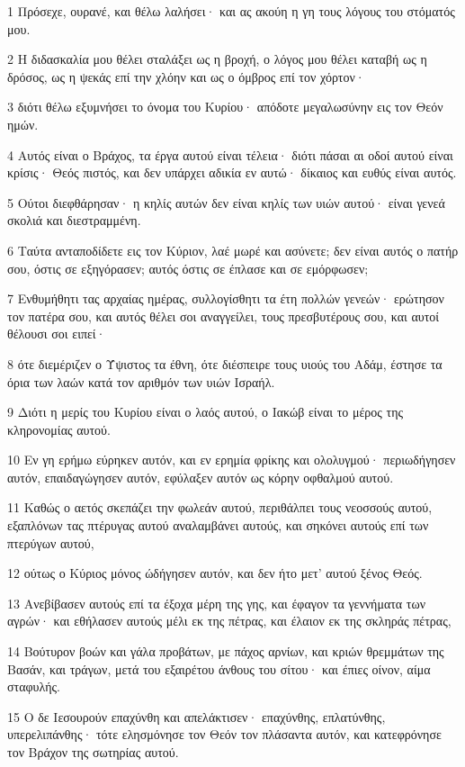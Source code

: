 \par 1 Πρόσεχε, ουρανέ, και θέλω λαλήσει· και ας ακούη η γη τους λόγους του στόματός μου.
\par 2 Η διδασκαλία μου θέλει σταλάξει ως η βροχή, ο λόγος μου θέλει καταβή ως η δρόσος, ως η ψεκάς επί την χλόην και ως ο όμβρος επί τον χόρτον·
\par 3 διότι θέλω εξυμνήσει το όνομα του Κυρίου· απόδοτε μεγαλωσύνην εις τον Θεόν ημών.
\par 4 Αυτός είναι ο Βράχος, τα έργα αυτού είναι τέλεια· διότι πάσαι αι οδοί αυτού είναι κρίσις· Θεός πιστός, και δεν υπάρχει αδικία εν αυτώ· δίκαιος και ευθύς είναι αυτός.
\par 5 Ούτοι διεφθάρησαν· η κηλίς αυτών δεν είναι κηλίς των υιών αυτού· είναι γενεά σκολιά και διεστραμμένη.
\par 6 Ταύτα ανταποδίδετε εις τον Κύριον, λαέ μωρέ και ασύνετε; δεν είναι αυτός ο πατήρ σου, όστις σε εξηγόρασεν; αυτός όστις σε έπλασε και σε εμόρφωσεν;
\par 7 Ενθυμήθητι τας αρχαίας ημέρας, συλλογίσθητι τα έτη πολλών γενεών· ερώτησον τον πατέρα σου, και αυτός θέλει σοι αναγγείλει, τους πρεσβυτέρους σου, και αυτοί θέλουσι σοι ειπεί·
\par 8 ότε διεμέριζεν ο Ύψιστος τα έθνη, ότε διέσπειρε τους υιούς του Αδάμ, έστησε τα όρια των λαών κατά τον αριθμόν των υιών Ισραήλ.
\par 9 Διότι η μερίς του Κυρίου είναι ο λαός αυτού, ο Ιακώβ είναι το μέρος της κληρονομίας αυτού.
\par 10 Εν γη ερήμω εύρηκεν αυτόν, και εν ερημία φρίκης και ολολυγμού· περιωδήγησεν αυτόν, επαιδαγώγησεν αυτόν, εφύλαξεν αυτόν ως κόρην οφθαλμού αυτού.
\par 11 Καθώς ο αετός σκεπάζει την φωλεάν αυτού, περιθάλπει τους νεοσσούς αυτού, εξαπλόνων τας πτέρυγας αυτού αναλαμβάνει αυτούς, και σηκόνει αυτούς επί των πτερύγων αυτού,
\par 12 ούτως ο Κύριος μόνος ώδήγησεν αυτόν, και δεν ήτο μετ' αυτού ξένος Θεός.
\par 13 Ανεβίβασεν αυτούς επί τα έξοχα μέρη της γης, και έφαγον τα γεννήματα των αγρών· και εθήλασεν αυτούς μέλι εκ της πέτρας, και έλαιον εκ της σκληράς πέτρας,
\par 14 Βούτυρον βοών και γάλα προβάτων, με πάχος αρνίων, και κριών θρεμμάτων της Βασάν, και τράγων, μετά του εξαιρέτου άνθους του σίτου· και έπιες οίνον, αίμα σταφυλής.
\par 15 Ο δε Ιεσουρούν επαχύνθη και απελάκτισεν· επαχύνθης, επλατύνθης, υπερελιπάνθης· τότε ελησμόνησε τον Θεόν τον πλάσαντα αυτόν, και κατεφρόνησε τον Βράχον της σωτηρίας αυτού.
